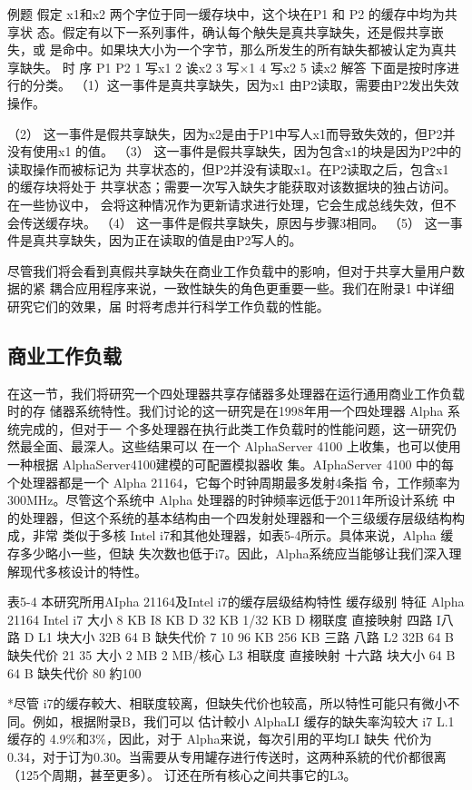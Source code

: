 例题
假定 x1和x2 两个字位于同一缓存块中，这个块在P1 和 P2 的缓存中均为共享状
态。假定有以下一系列事件，确认每个觖失是真共享缺失，还是假共享嵌失，或
是命中。如果块大小为一个字节，那么所发生的所有缺失都被认定为真共享缺失。
时
序
P1
P2
1
写x1
2
诶x2
3
写×1
4
写x2
5
读x2
解答
下面是按时序进行的分类。
（1）这一事件是真共享缺失，因为x1 由P2读取，需要由P2发出失效操作。

（2） 这一事件是假共享缺失，因为x2是由于P1中写人x1而导致失效的，但P2并
没有使用x1 的值。
（3） 这一事件是假共享缺失，因为包含x1的块是因为P2中的读取操作而被标记为
共享状态的，但P2并没有读取x1。在P2读取之后，包含x1 的缓存块将处于
共享状态；需要一次写入缺失才能获取对该数据块的独占访问。在一些协议中，
会将这种情况作为更新请求进行处理，它会生成总线失效，但不会传送缓存块。
（4） 这一事件是假共享缺失，原因与步骤3相同。
（5） 这一事件是真共享缺失，因为正在读取的值是由P2写人的。

尽管我们将会看到真假共享缺失在商业工作负载中的影响，但对于共享大量用户数据的紧
耦合应用程序来说，一致性缺失的角色更重要一些。我们在附录1 中详细研究它们的效果，届
时将考虑并行科学工作负载的性能。

\subsection{商业工作负载}
在这一节，我们将研究一个四处理器共享存储器多处理器在运行通用商业工作负载时的存
储器系统特性。我们讨论的这一研究是在1998年用一个四处理器 Alpha 系统完成的，但对于一
个多处理器在执行此类工作负载时的性能问题，这一研究仍然最全面、最深人。这些结果可以
在一个 AlphaServer 4100 上收集，也可以使用一种根据 AlphaServer4100建模的可配置模拟器收
集。AIphaServer 4100 中的每个处理器都是一个 Alpha 21164，它每个时钟周期最多发射4条指
令，工作频率为300MHz。尽管这个系统中 Alpha 处理器的时钟频率远低于2011年所设计系统
中的处理器，但这个系统的基本结构由一个四发射处理器和一个三级缓存层级结构构成，非常
类似于多核 Intel i7和其他处理器，如表5-4所示。具体来说，Alpha 缓存多少略小一些，但缺
失次数也低于i7。因此，Alpha系统应当能够让我们深入理解现代多核设计的特性。

表5-4 本研究所用AIpha 21164及Intel i7的缓存层级结构特性
缓存级别
特征
Alpha 21164
Intel i7
大小
8 KB I8 KB D
32 KB 1/32 KB D
栩联度
直接映射
四路 I八路 D
L1
块大小
32B
64 B
缺失代价
7
10
96 KB
256 KB
三路
八路
L2
32B
64 B
缺失代价
21
35
大小
2 MB
2 MB/核心
L3
相联度
直接映射
十六路
块大小
64 B
64 B
缺失代价
80
約100

*尽管 i7的缓存較大、相联度较离，但缺失代价也较高，所以特性可能只有微小不同。例如，根据附录B，我们可以
估计較小 AlphaLI 缓存的缺失率沟较大 i7 L.1缓存的 4.9\%和3\%，因此，对于 Alpha来说，每次引用的平均LI 缺失
代价为0.34，对于订为0.30。当需要从专用罐存进行传送时，这两种系統的代价都很离（125个周期，甚至更多）。
订还在所有核心之间共事它的L3。

